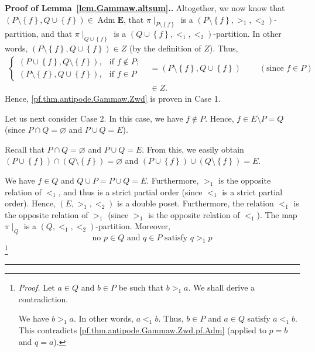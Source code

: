 \documentclass[numbers=enddot,12pt,final,onecolumn,notitlepage,abstracton]{scrartcl}%
\theoremstyle{definition}
\newenvironment{proof}[1][Proof]{\noindent\textbf{#1.} }{\ \rule{0.5em}{0.5em}}
\newcommand{\Adm}{\operatorname{Adm}}
\newcommand{\EE}{{\mathbf{E}}}
\begin{document}
\begin{proof}[Proof of Lemma~\ref{lem.Gammaw.altsum}.]
Altogether, we now know that $\left(  P\setminus\left\{  f\right\}
,Q\cup\left\{  f\right\}  \right)  \in \Adm \EE$, that
$\pi\mid_{P\setminus\left\{  f\right\}  }$ is a $\left(  P\setminus\left\{
f\right\}  ,>_{1},<_{2}\right)  $-partition, and that $\pi\mid_{Q\cup\left\{
f\right\}  }$ is a $\left(  Q\cup\left\{  f\right\}  ,<_{1},<_{2}\right)
$-partition. In other words, $\left(  P\setminus\left\{  f\right\}
,Q\cup\left\{  f\right\}  \right)  \in Z$ (by the definition of $Z$). Thus,
\begin{align*}
\begin{cases}
\left(  P\cup\left\{  f\right\}  ,Q\setminus\left\{  f\right\}  \right)  , &
\text{if }f\notin P;\\
\left(  P\setminus\left\{  f\right\}  ,Q\cup\left\{  f\right\}  \right)  , &
\text{if }f\in P
\end{cases}
& =\left(  P\setminus\left\{  f\right\}  ,Q\cup\left\{  f\right\}  \right)
\ \ \ \ \ \ \ \ \ \ \left(  \text{since }f\in P\right)  \\
& \in Z.
\end{align*}
Hence, \eqref{pf.thm.antipode.Gammaw.Zwd} is proven in Case 1.

Let us next consider Case 2. In this case, we have $f\notin P$. Hence,
$f \in E \setminus P = Q$ (since
$P \cap Q = \varnothing$ and $P \cup Q = E$).

Recall that $P\cap Q=\varnothing$ and $P\cup Q=E$. From this, we easily obtain
$\left(  P\cup\left\{  f\right\}  \right)  \cap\left(  Q\setminus\left\{
f\right\}  \right)  =\varnothing$ and $\left(  P\cup\left\{  f\right\}
\right)  \cup\left(  Q\setminus\left\{  f\right\}  \right)  =E$.

We have $f \in Q$ and
$Q \cup P = P \cup Q = E$. Furthermore, $>_1$ is the
opposite relation of $<_1$, and thus is a strict partial
order (since $<_1$ is a strict partial order). Hence,
$\left(E, >_1, <_2\right)$ is a double poset. Furthermore,
the relation $<_1$ is the opposite relation of $>_1$ (since $>_1$
is the opposite relation of $<_1$).
The map
$\pi\mid_Q$ is a $\left(Q, <_1, <_2\right)$-partition. Moreover,
\begin{equation}
\text{no } p \in Q \text{ and } q \in P \text{ satisfy }
q >_1 p
\label{pf.thm.antipode.Gammaw.Zwd.pf.AdmQP}
\end{equation}
\footnote{\textit{Proof.} Let $a \in Q$ and $b \in P$ be such that
$b >_1 a$. We shall derive a contradiction.

We have $b >_1 a$. In other words, $a <_1 b$. Thus, $b \in P$ and
$a \in Q$ satisfy $a <_1 b$. This contradicts
\eqref{pf.thm.antipode.Gammaw.Zwd.pf.Adm} (applied to $p = b$ and
$q = a$).

}
\end{proof}
\end{document}
